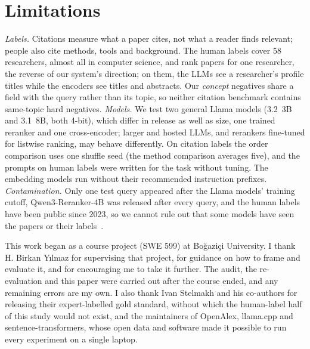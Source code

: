\documentclass[sigconf,nonacm]{acmart}
\begin{document}
\section{Limitations}
\label{sec:limitations}
\emph{Labels.} Citations measure what a paper cites, not what a reader finds relevant; people also cite methods, tools and background. The human labels cover 58 researchers, almost all in computer science, and rank papers for one researcher, the reverse of our system's direction; on them, the LLMs see a researcher's profile titles while the encoders see titles and abstracts. Our \emph{concept} negatives share a field with the query rather than its topic, so neither citation benchmark contains same-topic hard negatives.
\emph{Models.} We test two general Llama models (3.2~3B and 3.1~8B, both 4-bit), which differ in release as well as size, one trained reranker and one cross-encoder; larger and hosted LLMs, and rerankers fine-tuned for listwise ranking, may behave differently. On citation labels the order comparison uses one shuffle seed (the method comparison averages five), and the prompts on human labels were written for the task without tuning. The embedding models run without their recommended instruction prefixes.
\emph{Contamination.} Only one test query appeared after the Llama models' training cutoff, Qwen3-Reranker-4B was released after every query, and the human labels have been public since 2023, so we cannot rule out that some models have seen the papers or their labels~\citep{sainz2023contamination}.

\begin{acks}
This work began as a course project (SWE 599) at Boğaziçi University. I thank H. Birkan Yılmaz for supervising that project, for guidance on how to frame and evaluate it, and for encouraging me to take it further. The audit, the re-evaluation and this paper were carried out after the course ended, and any remaining errors are my own. I also thank Ivan Stelmakh and his co-authors for releasing their expert-labelled gold standard, without which the human-label half of this study would not exist, and the maintainers of OpenAlex, llama.cpp and sentence-transformers, whose open data and software made it possible to run every experiment on a single laptop.
\end{acks}




\appendix
\end{document}
